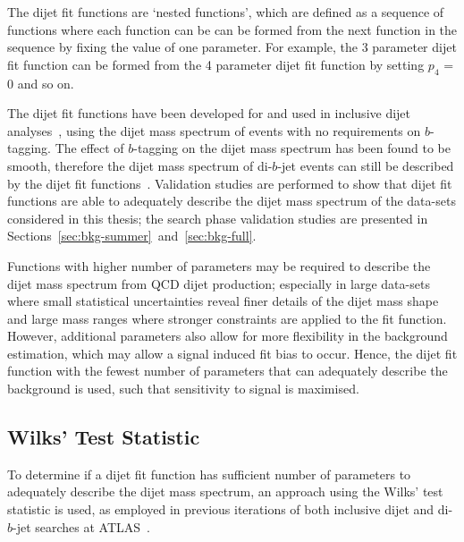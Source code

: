 The dijet fit functions are `nested functions',
which are defined as a sequence of functions where each function can be can be formed from the next function in the sequence by fixing the value of one parameter.
For example, the 3 parameter dijet fit function can be formed from the 4 parameter dijet fit function by setting $p_4$ = 0 and so on.

The dijet fit functions have been developed for and used in inclusive dijet analyses~\cite{theo-dijet_harris},
using the dijet mass spectrum of events with no requirements on $b$-tagging.
The effect of $b$-tagging on the dijet mass spectrum has been found to be smooth,
therefore the dijet mass spectrum of di-$b$-jet events can still be described by the dijet fit functions~\cite{dibjet-mori16_paper}.
Validation studies are performed to show that dijet fit functions are able
to adequately describe the dijet mass spectrum of the data-sets considered in this thesis;
the search phase validation studies are presented in Sections~\ref{sec:bkg-summer}~and~\ref{sec:bkg-full}.

Functions with higher number of parameters may be required to describe the dijet mass spectrum from QCD dijet production;
especially in large data-sets where small statistical uncertainties reveal finer details of the dijet mass shape
and large mass ranges where stronger constraints are applied to the fit function.
However, additional parameters also allow for more flexibility in the background estimation,
which may allow a signal induced fit bias to occur.
Hence, the dijet fit function with the fewest number of parameters
that can adequately describe the background is used, such that sensitivity to signal is maximised.

\vspace{1em}
\subsection{Wilks' Test Statistic} 
\label{sec:bkg-wilks}

To determine if a dijet fit function has sufficient number of parameters to adequately describe the dijet mass spectrum, an approach using the Wilks' test statistic is used,
as employed in previous iterations of both inclusive dijet and di-$b$-jet searches at ATLAS~\cite{dijet-mori16_paper,dibjet-mori16_paper}.


